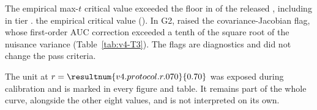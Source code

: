 The empirical max-$t$ critical value exceeded the  floor in  of the  released , including  in tier .  the empirical critical value (\allunitsresource). %
In G2,   raised the covariance-Jacobian flag, whose first-order AUC correction exceeded a tenth of the square root of the nuisance variance (Table~\ref{tab:v4-T3}). %
The flags are diagnostics and did not change the pass criteria. %


The unit at $r=\resultnum{v4.protocol.r.070}{0.70}$ was exposed during calibration and is marked in every figure and table. It remains part of the whole curve, alongside the other eight values, and is not interpreted on its own. %


